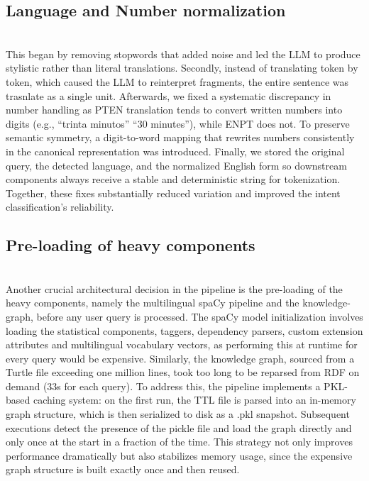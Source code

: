 \documentclass{article}
\begin{document}
\subsection{Language and Number normalization}
\noindent
\\
This began by removing stopwords that added noise and led the LLM to produce stylistic rather than literal translations. Secondly, instead of translating token by token, which caused the LLM to reinterpret fragments, the entire sentence was trasnlate as a single unit. Afterwards, we fixed a systematic discrepancy in number handling as PT\textrightarrow{}EN translation tends to convert written numbers into digits (e.g., ``trinta minutos'' \textrightarrow{} ``30 minutes''), while EN\textrightarrow{}PT does not. To preserve semantic symmetry, a digit-to-word mapping that rewrites numbers consistently in the canonical representation was introduced. Finally, we stored the original query, the detected language, and the normalized English form so downstream components always receive a stable and deterministic string for tokenization. Together, these fixes substantially reduced variation and improved the intent classification's reliability.

\subsection{Pre-loading of heavy components}
\noindent
\\
Another crucial architectural decision in the pipeline is the pre-loading of the heavy components, namely the multilingual spaCy pipeline and the knowledge-graph, before any user query is processed. The spaCy model initialization involves loading the statistical components, taggers, dependency parsers, custom extension attributes and multilingual vocabulary vectors, as performing this at runtime for every query would be expensive. Similarly, the knowledge graph, sourced from a Turtle file exceeding one million lines, took too long to be reparsed from RDF on demand (33s for each query). To address this, the pipeline implements a PKL-based \cite{python_pickle_docs} caching system: on the first run, the TTL file is parsed into an in-memory graph structure, which is then serialized to disk as a .pkl snapshot. Subsequent executions detect the presence of the pickle file and load the graph directly and only once at the start in a fraction of the time. This strategy not only improves performance dramatically but also stabilizes memory usage, since the expensive graph structure is built exactly once and then reused.
\end{document}
